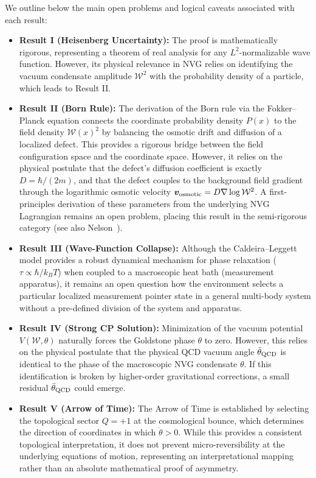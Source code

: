 \documentclass[12pt,a4paper]{article}
\theoremstyle{plain}
\theoremstyle{definition}
\theoremstyle{remark}
\newcommand{\hb}{\hbar}
\newcommand{\kB}{k_{\!B}}
\newcommand{\Wc}{\mathcal{W}}
\begin{document}
We outline below the main open problems and logical caveats associated with each result:
\begin{itemize}
  \item \textbf{Result I (Heisenberg Uncertainty):} The proof is mathematically rigorous, representing a theorem of real analysis for any $L^2$-normalizable wave function. However, its physical relevance in NVG relies on identifying the vacuum condensate amplitude $\Wc^2$ with the probability density of a particle, which leads to Result II.
  
  \item \textbf{Result II (Born Rule):} The derivation of the Born rule via the Fokker--Planck equation connects the coordinate probability density $P(x)$ to the field density $\Wc(x)^2$ by balancing the osmotic drift and diffusion of a localized defect. This provides a rigorous bridge between the field configuration space and the coordinate space. However, it relies on the physical postulate that the defect's diffusion coefficient is exactly $D = \hb/(2m)$, and that the defect couples to the background field gradient through the logarithmic osmotic velocity $\bm{v}_{\rm osmotic} = D \nabla \log \Wc^2$. A first-principles derivation of these parameters from the underlying NVG Lagrangian remains an open problem, placing this result in the semi-rigorous category (see also Nelson~\cite{Nelson1966}).
  
  \item \textbf{Result III (Wave-Function Collapse):} Although the Caldeira--Leggett model provides a robust dynamical mechanism for phase relaxation ($\tau \propto \hb/\kB T$) when coupled to a macroscopic heat bath (measurement apparatus), it remains an open question how the environment selects a particular localized measurement pointer state in a general multi-body system without a pre-defined division of the system and apparatus.
  
  \item \textbf{Result IV (Strong CP Solution):} Minimization of the vacuum potential $V(\Wc, \theta)$ naturally forces the Goldstone phase $\theta$ to zero. However, this relies on the physical postulate that the physical QCD vacuum angle $\bar\theta_{\rm QCD}$ is identical to the phase of the macroscopic NVG condensate $\theta$. If this identification is broken by higher-order gravitational corrections, a small residual $\bar\theta_{\rm QCD}$ could emerge.
  
  \item \textbf{Result V (Arrow of Time):} The Arrow of Time is established by selecting the topological sector $Q = +1$ at the cosmological bounce, which determines the direction of coordinates in which $\dot\theta > 0$. While this provides a consistent topological interpretation, it does not prevent micro-reversibility at the underlying equations of motion, representing an interpretational mapping rather than an absolute mathematical proof of asymmetry.
  

\end{itemize}
\end{document}

